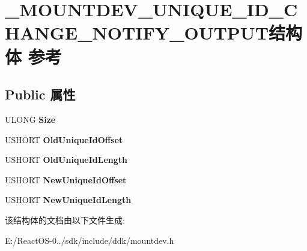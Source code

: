 \hypertarget{struct___m_o_u_n_t_d_e_v___u_n_i_q_u_e___i_d___c_h_a_n_g_e___n_o_t_i_f_y___o_u_t_p_u_t}{}\section{\+\_\+\+M\+O\+U\+N\+T\+D\+E\+V\+\_\+\+U\+N\+I\+Q\+U\+E\+\_\+\+I\+D\+\_\+\+C\+H\+A\+N\+G\+E\+\_\+\+N\+O\+T\+I\+F\+Y\+\_\+\+O\+U\+T\+P\+U\+T结构体 参考}
\label{struct___m_o_u_n_t_d_e_v___u_n_i_q_u_e___i_d___c_h_a_n_g_e___n_o_t_i_f_y___o_u_t_p_u_t}
\subsection*{Public 属性}
\begin{DoxyCompactItemize}
\item 
\mbox{\label{struct___m_o_u_n_t_d_e_v___u_n_i_q_u_e___i_d___c_h_a_n_g_e___n_o_t_i_f_y___o_u_t_p_u_t_a21dca3873044295eef3f50c90bb9ee3a}} 
U\+L\+O\+NG {\bfseries Size}
\item 
\mbox{\label{struct___m_o_u_n_t_d_e_v___u_n_i_q_u_e___i_d___c_h_a_n_g_e___n_o_t_i_f_y___o_u_t_p_u_t_ae115a01dc0d5e219b35eb7e24b34e645}} 
U\+S\+H\+O\+RT {\bfseries Old\+Unique\+Id\+Offset}
\item 
\mbox{\label{struct___m_o_u_n_t_d_e_v___u_n_i_q_u_e___i_d___c_h_a_n_g_e___n_o_t_i_f_y___o_u_t_p_u_t_abb6d2eb59788bda591335d318d499054}} 
U\+S\+H\+O\+RT {\bfseries Old\+Unique\+Id\+Length}
\item 
\mbox{\label{struct___m_o_u_n_t_d_e_v___u_n_i_q_u_e___i_d___c_h_a_n_g_e___n_o_t_i_f_y___o_u_t_p_u_t_a383eb66bd76f4c904aa538872bace461}} 
U\+S\+H\+O\+RT {\bfseries New\+Unique\+Id\+Offset}
\item 
\mbox{\label{struct___m_o_u_n_t_d_e_v___u_n_i_q_u_e___i_d___c_h_a_n_g_e___n_o_t_i_f_y___o_u_t_p_u_t_ade58578c816bfa77921482625bafa18c}} 
U\+S\+H\+O\+RT {\bfseries New\+Unique\+Id\+Length}
\end{DoxyCompactItemize}


该结构体的文档由以下文件生成\+:\begin{DoxyCompactItemize}
\item 
E\+:/\+React\+O\+S-\/0../sdk/include/ddk/mountdev.\+h\end{DoxyCompactItemize}
